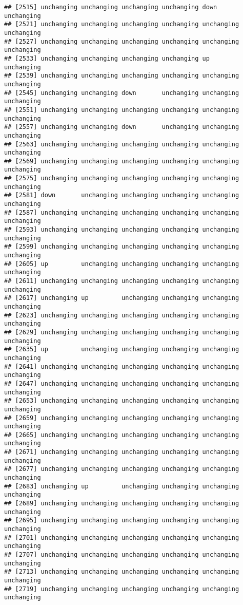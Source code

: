 \documentclass[]{article}
\begin{document}
\begin{verbatim}
## [2515] unchanging unchanging unchanging unchanging down       unchanging
## [2521] unchanging unchanging unchanging unchanging unchanging unchanging
## [2527] unchanging unchanging unchanging unchanging unchanging unchanging
## [2533] unchanging unchanging unchanging unchanging up         unchanging
## [2539] unchanging unchanging unchanging unchanging unchanging unchanging
## [2545] unchanging unchanging down       unchanging unchanging unchanging
## [2551] unchanging unchanging unchanging unchanging unchanging unchanging
## [2557] unchanging unchanging down       unchanging unchanging unchanging
## [2563] unchanging unchanging unchanging unchanging unchanging unchanging
## [2569] unchanging unchanging unchanging unchanging unchanging unchanging
## [2575] unchanging unchanging unchanging unchanging unchanging unchanging
## [2581] down       unchanging unchanging unchanging unchanging unchanging
## [2587] unchanging unchanging unchanging unchanging unchanging unchanging
## [2593] unchanging unchanging unchanging unchanging unchanging unchanging
## [2599] unchanging unchanging unchanging unchanging unchanging unchanging
## [2605] up         unchanging unchanging unchanging unchanging unchanging
## [2611] unchanging unchanging unchanging unchanging unchanging unchanging
## [2617] unchanging up         unchanging unchanging unchanging unchanging
## [2623] unchanging unchanging unchanging unchanging unchanging unchanging
## [2629] unchanging unchanging unchanging unchanging unchanging unchanging
## [2635] up         unchanging unchanging unchanging unchanging unchanging
## [2641] unchanging unchanging unchanging unchanging unchanging unchanging
## [2647] unchanging unchanging unchanging unchanging unchanging unchanging
## [2653] unchanging unchanging unchanging unchanging unchanging unchanging
## [2659] unchanging unchanging unchanging unchanging unchanging unchanging
## [2665] unchanging unchanging unchanging unchanging unchanging unchanging
## [2671] unchanging unchanging unchanging unchanging unchanging unchanging
## [2677] unchanging unchanging unchanging unchanging unchanging unchanging
## [2683] unchanging up         unchanging unchanging unchanging unchanging
## [2689] unchanging unchanging unchanging unchanging unchanging unchanging
## [2695] unchanging unchanging unchanging unchanging unchanging unchanging
## [2701] unchanging unchanging unchanging unchanging unchanging unchanging
## [2707] unchanging unchanging unchanging unchanging unchanging unchanging
## [2713] unchanging unchanging unchanging unchanging unchanging unchanging
## [2719] unchanging unchanging unchanging unchanging unchanging unchanging

\end{verbatim}
\end{document}
